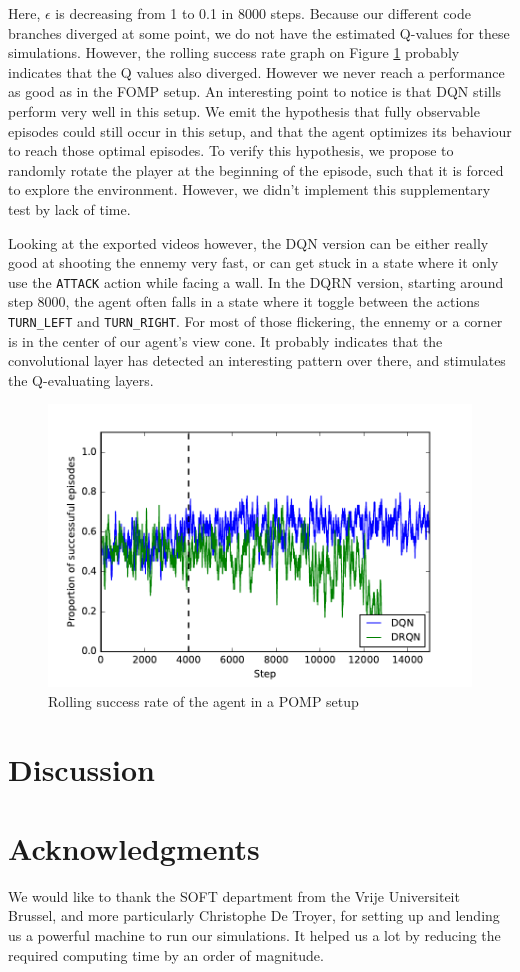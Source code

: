 \documentclass[letterpaper]{article}
\begin{document}
Here, $\epsilon$ is decreasing from 1 to 0.1 in 8000 steps.
Because our different code branches diverged at some point,
we do not have the estimated Q-values for these simulations.
However, the rolling success rate graph on Figure \ref{successmore} probably indicates
that the Q values also diverged. However we never reach a performance as good as in 
the FOMP setup. An interesting point to notice is that DQN stills perform very well
in this setup. We emit the hypothesis that fully observable episodes could still
occur in this setup, and that the agent optimizes its behaviour to reach those optimal
episodes. To verify this hypothesis, we propose to randomly rotate the player at the
beginning of the episode, such that it is forced to explore the environment. However,
we didn't implement this supplementary test by lack of time.

Looking at the exported videos however, the DQN version can be either really good at shooting
the ennemy very fast, or can get stuck in a state where it only use the \texttt{ATTACK}
action while facing a wall. In the DQRN version, starting around step 8000,
the agent often falls in a state where it
toggle between the actions \texttt{TURN\_LEFT} and \texttt{TURN\_RIGHT}. For most of
those flickering, the ennemy or a corner is in the center of our agent's view cone.
It probably indicates that the convolutional layer has detected an interesting pattern over there,
and stimulates the Q-evaluating layers.

\begin{figure}
    \includegraphics[width=.5\textwidth]{Graphs/success_more.pdf}
    \caption{Rolling success rate of the agent in a POMP setup}
    \label{successmore}
\end{figure}

\section{Discussion}


\section{Acknowledgments}
We would like to thank the SOFT department from the Vrije Universiteit Brussel,
and more particularly Christophe De Troyer, for setting up and lending us a
powerful machine to run our simulations. It helped us a lot by reducing the
required computing time by an order of magnitude.

\footnotesize


\end{document}
